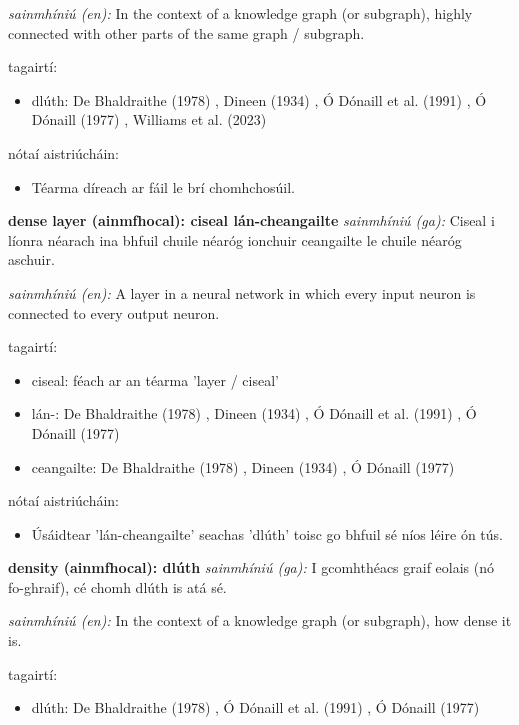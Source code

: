 \documentclass{article}
\begin{document}
\textit{sainmhíniú (en):} In the context of a knowledge graph (or subgraph), highly connected with other parts of the same graph / subgraph.

tagairtí:
\begin{itemize}
	\item dlúth: De Bhaldraithe (1978) \cite{de-bhaldraithe}, Dineen (1934) \cite{dineen}, Ó Dónaill et al. (1991) \cite{focloir-beag}, Ó Dónaill (1977) \cite{odonaill}, Williams et al. (2023) \cite{storchiste}
\end{itemize}

nótaí aistriúcháin:
\begin{itemize}
	\item Téarma díreach ar fáil le brí chomhchosúil.
\end{itemize}


\textbf{dense layer (ainmfhocal): ciseal lán-cheangailte}
\textit{sainmhíniú (ga):} Ciseal i líonra néarach ina bhfuil chuile néaróg ionchuir ceangailte le chuile néaróg aschuir.

\textit{sainmhíniú (en):} A layer in a neural network in which every input neuron is connected to every output neuron.

tagairtí:
\begin{itemize}
	\item ciseal: féach ar an téarma 'layer / ciseal'
	\item lán-: De Bhaldraithe (1978) \cite{de-bhaldraithe}, Dineen (1934) \cite{dineen}, Ó Dónaill et al. (1991) \cite{focloir-beag}, Ó Dónaill (1977) \cite{odonaill}
	\item ceangailte: De Bhaldraithe (1978) \cite{de-bhaldraithe}, Dineen (1934) \cite{dineen}, Ó Dónaill (1977) \cite{odonaill}
\end{itemize}

nótaí aistriúcháin:
\begin{itemize}
	\item Úsáidtear 'lán-cheangailte' seachas 'dlúth' toisc go bhfuil sé níos léire ón tús.
\end{itemize}


\textbf{density (ainmfhocal): dlúth}
\textit{sainmhíniú (ga):} I gcomhthéacs graif eolais (nó fo-ghraif), cé chomh dlúth is atá sé.

\textit{sainmhíniú (en):} In the context of a knowledge graph (or subgraph), how dense it is.

tagairtí:
\begin{itemize}
	\item dlúth: De Bhaldraithe (1978) \cite{de-bhaldraithe}, Ó Dónaill et al. (1991) \cite{focloir-beag}, Ó Dónaill (1977) \cite{odonaill}
\end{itemize}
\end{document}
